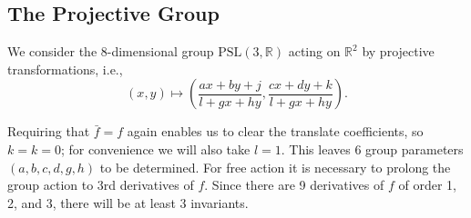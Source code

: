 \documentclass[review,onefignum,onetabnum]{siamonline190516}
\def\R{\mathbb{R}}
\begin{document}
{\subsection{The Projective Group}

We consider the 8-dimensional group $\mathrm{PSL}(3,\R)$ acting on $\R^2$ by projective transformations, i.e., $$(x,y) \mapsto \left(\frac{a x + b y + j}{l + g x + h y}, \frac{c x + d y + k}{l+ g x + h y}\right).$$

Requiring that $\bar f = f$ again enables us to clear the translate coefficients, so $k=k=0$; for convenience we will also take $l=1$. This leaves 6 group parameters $(a,b,c,d,g,h)$ to be determined. For free action it is necessary to prolong the group action to 3rd derivatives of $f$. Since there are 9 derivatives of $f$ of order 1, 2, and 3, there will be at least 3 invariants.

}
\end{document}
